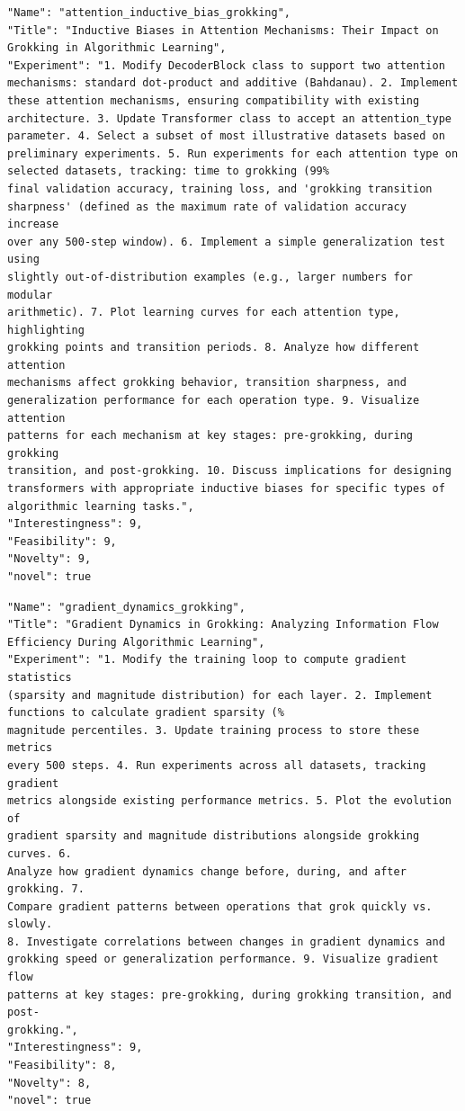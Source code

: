 \documentclass[11pt, a4paper]{include/gdm_format}
\begin{document}
\begin{tcolorbox}[breakable,colback=blue!5!white, colframe=blue!75!black, title=Idea 37/50 - \texttt{attention\_inductive\_bias\_grokking}]
\small
\begin{verbatim}
"Name": "attention_inductive_bias_grokking",
"Title": "Inductive Biases in Attention Mechanisms: Their Impact on
Grokking in Algorithmic Learning",
"Experiment": "1. Modify DecoderBlock class to support two attention
mechanisms: standard dot-product and additive (Bahdanau). 2. Implement
these attention mechanisms, ensuring compatibility with existing
architecture. 3. Update Transformer class to accept an attention_type
parameter. 4. Select a subset of most illustrative datasets based on
preliminary experiments. 5. Run experiments for each attention type on
selected datasets, tracking: time to grokking (99%
final validation accuracy, training loss, and 'grokking transition
sharpness' (defined as the maximum rate of validation accuracy increase
over any 500-step window). 6. Implement a simple generalization test using
slightly out-of-distribution examples (e.g., larger numbers for modular
arithmetic). 7. Plot learning curves for each attention type, highlighting
grokking points and transition periods. 8. Analyze how different attention
mechanisms affect grokking behavior, transition sharpness, and
generalization performance for each operation type. 9. Visualize attention
patterns for each mechanism at key stages: pre-grokking, during grokking
transition, and post-grokking. 10. Discuss implications for designing
transformers with appropriate inductive biases for specific types of
algorithmic learning tasks.",
"Interestingness": 9,
"Feasibility": 9,
"Novelty": 9,
"novel": true
\end{verbatim}
\end{tcolorbox}

\begin{tcolorbox}[breakable,colback=blue!5!white, colframe=blue!75!black, title=Idea 38/50 - \texttt{gradient\_dynamics\_grokking}]
\small
\begin{verbatim}
"Name": "gradient_dynamics_grokking",
"Title": "Gradient Dynamics in Grokking: Analyzing Information Flow
Efficiency During Algorithmic Learning",
"Experiment": "1. Modify the training loop to compute gradient statistics
(sparsity and magnitude distribution) for each layer. 2. Implement
functions to calculate gradient sparsity (%
magnitude percentiles. 3. Update training process to store these metrics
every 500 steps. 4. Run experiments across all datasets, tracking gradient
metrics alongside existing performance metrics. 5. Plot the evolution of
gradient sparsity and magnitude distributions alongside grokking curves. 6.
Analyze how gradient dynamics change before, during, and after grokking. 7.
Compare gradient patterns between operations that grok quickly vs. slowly.
8. Investigate correlations between changes in gradient dynamics and
grokking speed or generalization performance. 9. Visualize gradient flow
patterns at key stages: pre-grokking, during grokking transition, and post-
grokking.",
"Interestingness": 9,
"Feasibility": 8,
"Novelty": 8,
"novel": true
\end{verbatim}
\end{tcolorbox}
\end{document}
